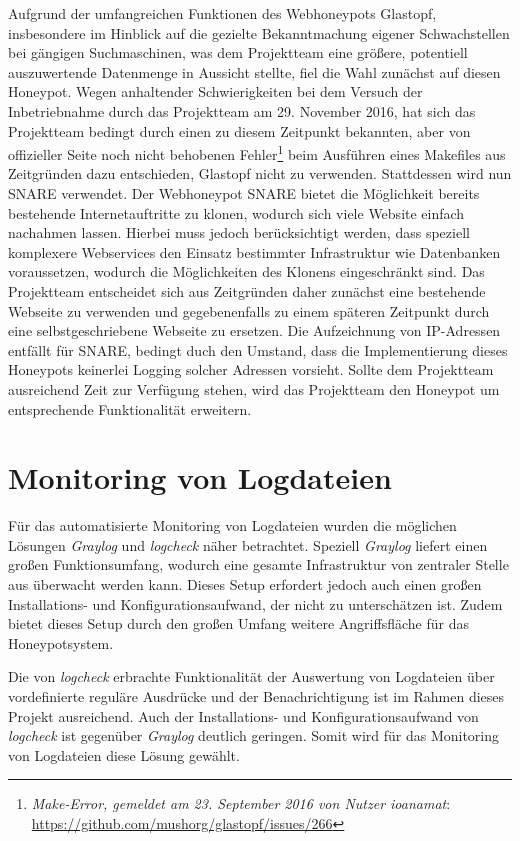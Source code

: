 Aufgrund der umfangreichen Funktionen des Webhoneypots Glastopf, insbesondere im Hinblick auf die gezielte Bekanntmachung eigener Schwachstellen bei gängigen Suchmaschinen, was dem Projektteam eine größere, potentiell auszuwertende Datenmenge in Aussicht stellte, fiel die Wahl zunächst auf diesen Honeypot. Wegen anhaltender Schwierigkeiten bei dem Versuch der Inbetriebnahme durch das Projektteam am 29. November 2016, hat sich das Projektteam bedingt durch einen zu diesem Zeitpunkt bekannten, aber von offizieller Seite noch nicht behobenen Fehler\footnote{ \textit{Make-Error, gemeldet am 23. September 2016 von Nutzer ioanamat}: \url{https://github.com/mushorg/glastopf/issues/266}} beim Ausführen eines Makefiles aus Zeitgründen dazu entschieden, Glastopf nicht zu verwenden. Stattdessen wird nun SNARE verwendet. Der Webhoneypot SNARE bietet die Möglichkeit bereits bestehende Internetauftritte zu klonen, wodurch sich viele Website einfach nachahmen lassen. Hierbei muss jedoch berücksichtigt werden, dass speziell komplexere Webservices den Einsatz bestimmter Infrastruktur wie Datenbanken voraussetzen, wodurch die Möglichkeiten des Klonens eingeschränkt sind. Das Projektteam entscheidet sich aus Zeitgründen daher zunächst eine bestehende Webseite zu verwenden und gegebenenfalls zu einem späteren Zeitpunkt durch eine selbstgeschriebene Webseite zu ersetzen. Die Aufzeichnung von IP-Adressen entfällt für SNARE, bedingt duch den Umstand, dass die Implementierung dieses Honeypots keinerlei Logging solcher Adressen vorsieht. Sollte dem Projektteam ausreichend Zeit zur Verfügung stehen, wird das Projektteam den Honeypot um entsprechende Funktionalität erweitern.


\section{Monitoring von Logdateien}
\label{sec:Monitoring von Logdateien}

Für das automatisierte Monitoring von Logdateien wurden die möglichen Lösungen \textit{Graylog} und \textit{logcheck} näher betrachtet. Speziell \textit{Graylog} liefert einen großen Funktionsumfang, wodurch eine gesamte Infrastruktur von zentraler Stelle aus überwacht werden kann. Dieses Setup erfordert jedoch auch einen großen Installations- und Konfigurationsaufwand, der nicht zu unterschätzen ist. Zudem bietet dieses Setup durch den großen Umfang weitere Angriffsfläche für das Honeypotsystem.

Die von \textit{logcheck} erbrachte Funktionalität der Auswertung von Logdateien über vordefinierte reguläre Ausdrücke und der Benachrichtigung ist im Rahmen dieses Projekt ausreichend. Auch der Installations- und Konfigurationsaufwand von \textit{logcheck} ist gegenüber \textit{Graylog} deutlich geringen. Somit wird für das Monitoring von Logdateien diese Lösung gewählt.


